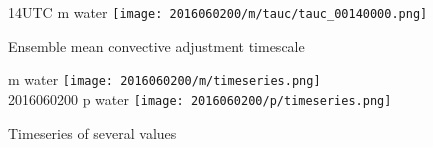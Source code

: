 \documentclass[a4paper, 12pt]{article}
\begin{document}
\begin{figure}[ht] \label{fig:case1_tau_c}
\noindent {} 14UTC m water
\texttt{[image: 2016060200/m/tauc/tauc\_00140000.png]}\\
\caption{Ensemble mean convective adjustment timescale}
\end{figure}

\begin{figure}[ht] \label{fig:case1_timeseries}
\noindent {} m water
\texttt{[image: 2016060200/m/timeseries.png]}\\
2016060200 p water
\texttt{[image: 2016060200/p/timeseries.png]}\\
\caption{Timeseries of several values}
\end{figure}
\end{document}

